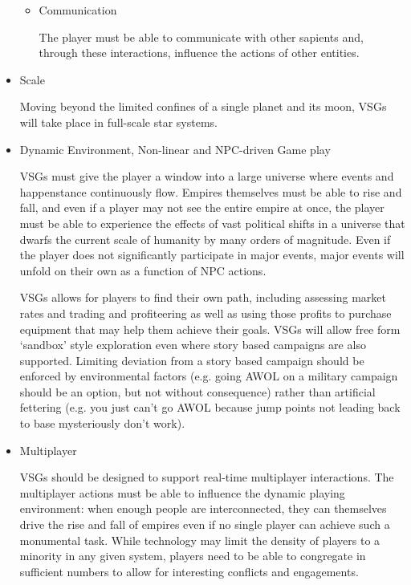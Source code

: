 \begin{itemize}
\begin{itemize}
\item Communication

The player must be able to communicate with other sapients and,
through these interactions, influence the actions of other entities.

\end{itemize}

\item Scale

Moving beyond the limited confines of a single planet and its moon,
VSGs will take place in full-scale star systems. 

\item Dynamic Environment, Non-linear and NPC-driven Game play

VSGs must give the player a window into a large universe where events
and happenstance continuously flow. Empires themselves must be able to
rise and fall, and even if a player may not see the entire empire at
once, the player must be able to experience the effects of vast
political shifts in a universe that dwarfs the current scale of
humanity by many orders of magnitude. Even if the player does not
significantly participate in major events, major events will unfold on
their own as a function of NPC actions.

VSGs allows for players to find their own path, including assessing
market rates and trading and profiteering as well as using those
profits to purchase equipment that may help them achieve their
goals. VSGs will allow free form `sandbox' style exploration even
where story based campaigns are also supported. Limiting deviation
from a story based campaign should be enforced by environmental
factors (e.g. going AWOL on a military campaign should be an option,
but not without consequence) rather than artificial fettering
(e.g. you just can't go AWOL because jump points not leading back to
base mysteriously don't work).


\item Multiplayer

VSGs should be designed to support real-time multiplayer
interactions. The multiplayer actions must be able to influence the
dynamic playing environment: when enough people are interconnected, they can
themselves drive the rise and fall of empires even if no single player
can achieve such a monumental task. While technology may limit the
density of players to a minority in any given system, players need to
be able to congregate in sufficient numbers to allow for interesting
conflicts and engagements.


\end{itemize}
